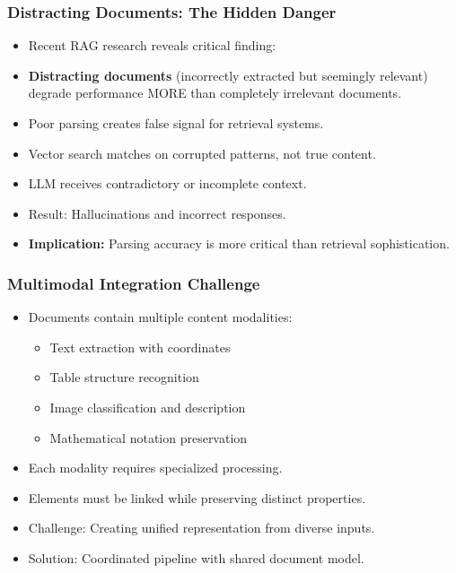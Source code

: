 \begin{frame}[fragile]\frametitle{Distracting Documents: The Hidden Danger}
      \begin{itemize}
        \item Recent RAG research reveals critical finding:
        \item \textbf{Distracting documents} (incorrectly extracted but seemingly relevant) degrade performance MORE than completely irrelevant documents.
        \item Poor parsing creates false signal for retrieval systems.
        \item Vector search matches on corrupted patterns, not true content.
        \item LLM receives contradictory or incomplete context.
        \item Result: Hallucinations and incorrect responses.
        \item \textbf{Implication:} Parsing accuracy is more critical than retrieval sophistication.
      \end{itemize}
\end{frame}

\begin{frame}[fragile]\frametitle{Multimodal Integration Challenge}
      \begin{itemize}
        \item Documents contain multiple content modalities:
        \begin{itemize}
          \item Text extraction with coordinates
          \item Table structure recognition
          \item Image classification and description
          \item Mathematical notation preservation
        \end{itemize}
        \item Each modality requires specialized processing.
        \item Elements must be linked while preserving distinct properties.
        \item Challenge: Creating unified representation from diverse inputs.
        \item Solution: Coordinated pipeline with shared document model.
      \end{itemize}
\end{frame}

